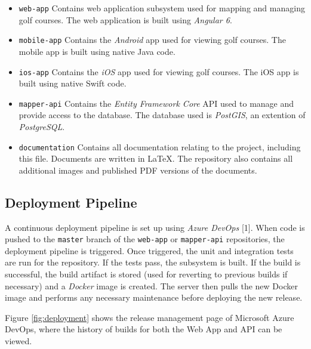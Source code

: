 \documentclass{article}
\begin{document}
    \begin{itemize}
        \item \texttt{web-app}
            \subitem Contains web application subsystem used for mapping and
            managing golf courses. The web application is built using
            \textit{Angular 6}.
        \item \texttt{mobile-app}
            \subitem Contains the \textit{Android} app used for viewing golf
            courses. The mobile app is built using native Java code.
        \item \texttt{ios-app}
            \subitem Contains the \textit{iOS} app used for viewing golf
            courses. The iOS app is built using native Swift code.
        \item \texttt{mapper-api}
            \subitem Contains the \textit{Entity Framework Core} API used to
            manage and provide access to the database. The database used is
            \textit{PostGIS}, an extention of \textit{PostgreSQL}.
        \item \texttt{documentation}
            \subitem Contains all documentation relating to the project,
            including this file. Documents are written in \LaTeX. The repository
            also contains all additional images and published PDF versions of
            the documents.
    \end{itemize}

    \subsection{Deployment Pipeline}
    \label{sec:pipe}

    A continuous deployment pipeline is set up using \textit{Azure DevOps}
    [1]. When code is pushed to the \texttt{master} branch of the
    \texttt{web-app} or \texttt{mapper-api} repositories, the deployment
    pipeline is triggered. Once triggered, the unit and integration tests are
    run for the repository. If the tests pass, the subsystem is built. If the
    build is successful, the build artifact is stored (used for reverting to
    previous builds if necessary) and a \textit{Docker} image is created. The
    server then pulls the new Docker image and performs any necessary
    maintenance before deploying the new release.

    Figure \ref{fig:deployment} shows the release management page of Microsoft
    Azure DevOps, where the history of builds for both the Web App and API can
    be viewed.
\end{document}
